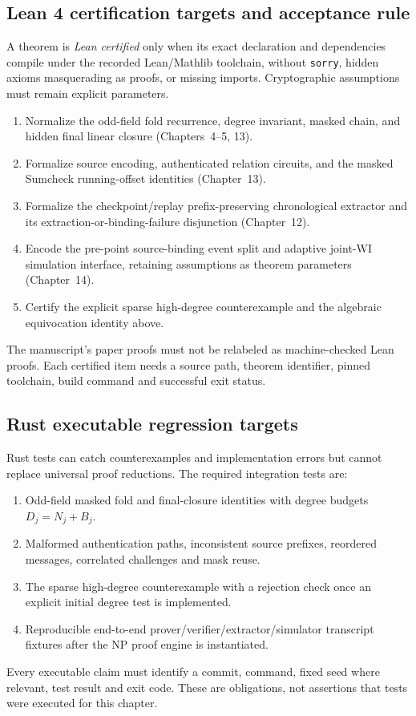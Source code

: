 \subsection{Lean 4 certification targets and acceptance rule}
A theorem is \emph{Lean certified} only when its exact declaration and dependencies compile under the recorded Lean/Mathlib toolchain, without \texttt{sorry}, hidden axioms masquerading as proofs, or missing imports. Cryptographic assumptions must remain explicit parameters.
\begin{enumerate}[label=\textbf{L\arabic*.}]
\item Normalize the odd-field fold recurrence, degree invariant, masked chain, and hidden final linear closure (Chapters~4--5, 13).
\item Formalize source encoding, authenticated relation circuits, and the masked Sumcheck running-offset identities (Chapter~13).
\item Formalize the checkpoint/replay prefix-preserving chronological extractor and its extraction-or-binding-failure disjunction (Chapter~12).
\item Encode the pre-point source-binding event split and adaptive joint-WI simulation interface, retaining assumptions as theorem parameters (Chapter~14).
\item Certify the explicit sparse high-degree counterexample and the algebraic equivocation identity above.
\end{enumerate}
The manuscript's paper proofs must not be relabeled as machine-checked Lean proofs. Each certified item needs a source path, theorem identifier, pinned toolchain, build command and successful exit status.

\subsection{Rust executable regression targets}
Rust tests can catch counterexamples and implementation errors but cannot replace universal proof reductions. The required integration tests are:
\begin{enumerate}[label=\textbf{R\arabic*.}]
\item Odd-field masked fold and final-closure identities with degree budgets $D_j=N_j+B_j$.
\item Malformed authentication paths, inconsistent source prefixes, reordered messages, correlated challenges and mask reuse.
\item The sparse high-degree counterexample with a rejection check once an explicit initial degree test is implemented.
\item Reproducible end-to-end prover/verifier/extractor/simulator transcript fixtures after the NP proof engine is instantiated.
\end{enumerate}
Every executable claim must identify a commit, command, fixed seed where relevant, test result and exit code. These are obligations, not assertions that tests were executed for this chapter.

